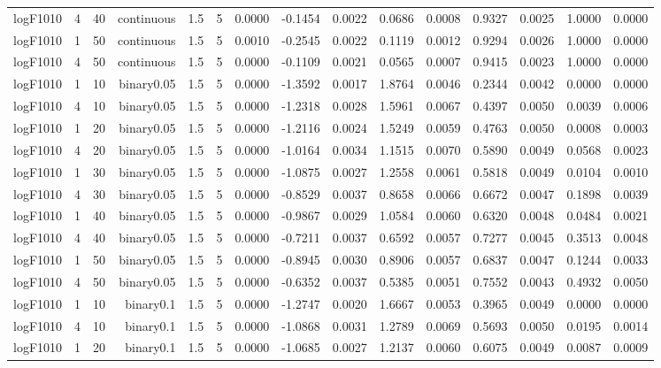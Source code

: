 \begin{longtable}{rrrrrrrrrrrrrrr}
  logF1010 & 4 & 40 & continuous & 1.5 & 5 & 0.0000 & -0.1454 & 0.0022 & 0.0686 & 0.0008 & 0.9327 & 0.0025 & 1.0000 & 0.0000 \\ 
  logF1010 & 1 & 50 & continuous & 1.5 & 5 & 0.0010 & -0.2545 & 0.0022 & 0.1119 & 0.0012 & 0.9294 & 0.0026 & 1.0000 & 0.0000 \\ 
  logF1010 & 4 & 50 & continuous & 1.5 & 5 & 0.0000 & -0.1109 & 0.0021 & 0.0565 & 0.0007 & 0.9415 & 0.0023 & 1.0000 & 0.0000 \\ 
  logF1010 & 1 & 10 & binary0.05 & 1.5 & 5 & 0.0000 & -1.3592 & 0.0017 & 1.8764 & 0.0046 & 0.2344 & 0.0042 & 0.0000 & 0.0000 \\ 
  logF1010 & 4 & 10 & binary0.05 & 1.5 & 5 & 0.0000 & -1.2318 & 0.0028 & 1.5961 & 0.0067 & 0.4397 & 0.0050 & 0.0039 & 0.0006 \\ 
  logF1010 & 1 & 20 & binary0.05 & 1.5 & 5 & 0.0000 & -1.2116 & 0.0024 & 1.5249 & 0.0059 & 0.4763 & 0.0050 & 0.0008 & 0.0003 \\ 
  logF1010 & 4 & 20 & binary0.05 & 1.5 & 5 & 0.0000 & -1.0164 & 0.0034 & 1.1515 & 0.0070 & 0.5890 & 0.0049 & 0.0568 & 0.0023 \\ 
  logF1010 & 1 & 30 & binary0.05 & 1.5 & 5 & 0.0000 & -1.0875 & 0.0027 & 1.2558 & 0.0061 & 0.5818 & 0.0049 & 0.0104 & 0.0010 \\ 
  logF1010 & 4 & 30 & binary0.05 & 1.5 & 5 & 0.0000 & -0.8529 & 0.0037 & 0.8658 & 0.0066 & 0.6672 & 0.0047 & 0.1898 & 0.0039 \\ 
  logF1010 & 1 & 40 & binary0.05 & 1.5 & 5 & 0.0000 & -0.9867 & 0.0029 & 1.0584 & 0.0060 & 0.6320 & 0.0048 & 0.0484 & 0.0021 \\ 
  logF1010 & 4 & 40 & binary0.05 & 1.5 & 5 & 0.0000 & -0.7211 & 0.0037 & 0.6592 & 0.0057 & 0.7277 & 0.0045 & 0.3513 & 0.0048 \\ 
  logF1010 & 1 & 50 & binary0.05 & 1.5 & 5 & 0.0000 & -0.8945 & 0.0030 & 0.8906 & 0.0057 & 0.6837 & 0.0047 & 0.1244 & 0.0033 \\ 
  logF1010 & 4 & 50 & binary0.05 & 1.5 & 5 & 0.0000 & -0.6352 & 0.0037 & 0.5385 & 0.0051 & 0.7552 & 0.0043 & 0.4932 & 0.0050 \\ 
  logF1010 & 1 & 10 & binary0.1 & 1.5 & 5 & 0.0000 & -1.2747 & 0.0020 & 1.6667 & 0.0053 & 0.3965 & 0.0049 & 0.0000 & 0.0000 \\ 
  logF1010 & 4 & 10 & binary0.1 & 1.5 & 5 & 0.0000 & -1.0868 & 0.0031 & 1.2789 & 0.0069 & 0.5693 & 0.0050 & 0.0195 & 0.0014 \\ 
  logF1010 & 1 & 20 & binary0.1 & 1.5 & 5 & 0.0000 & -1.0685 & 0.0027 & 1.2137 & 0.0060 & 0.6075 & 0.0049 & 0.0087 & 0.0009 \\ 

\end{longtable}
